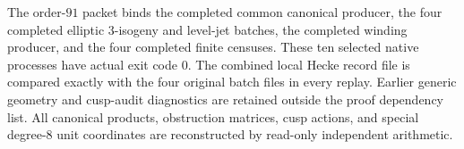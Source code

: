 \begin{remark}
The order-$91$ packet binds the completed common canonical producer, the four completed elliptic $3$-isogeny and level-jet batches, the completed winding producer, and the four completed finite censuses. These ten selected native processes have actual exit code $0$. The combined local Hecke record file is compared exactly with the four original batch files in every replay. Earlier generic geometry and cusp-audit diagnostics are retained outside the proof dependency list. All canonical products, obstruction matrices, cusp actions, and special degree-$8$ unit coordinates are reconstructed by read-only independent arithmetic.
\end{remark}
